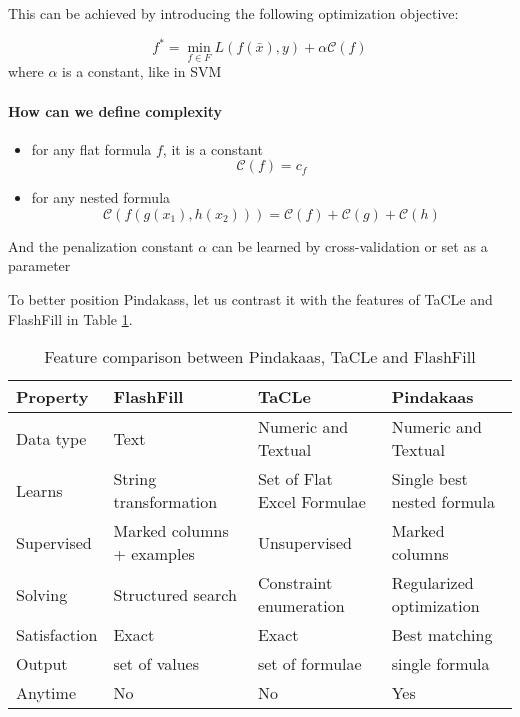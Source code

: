 This can be achieved by introducing the following optimization
objective:

  \begin{equation*}
    f^* = \min_{f \in F}{L(f(\bar x),y) + \alpha \mathcal{C}(f)}
  \end{equation*}
  where $\alpha$ is a constant, like in SVM

\paragraph{How can we define complexity}
  \begin{itemize}
     \item for any flat formula $f$, it is a constant
       \begin{equation*}
         \mathcal{C}(f) = c_f 
       \end{equation*}
     \item for any nested formula 
       \begin{equation*}
       \mathcal{C}(f(g(x_1),h(x_2))) = \mathcal{C}(f) + \mathcal{C}(g) + \mathcal{C}(h)
       \end{equation*}
  \end{itemize}
  And the penalization constant $\alpha$ can be learned by cross-validation or set as a parameter

To better position Pindakass, let us contrast it with the features of
TaCLe and FlashFill in Table \ref{tab:pindakaas_features}.
\begin{table}
  \begin{tabularx}{\textwidth}{l | X | X | X }
    \textbf{Property} & \textbf{FlashFill} & \textbf{TaCLe} &
    \textbf{Pindakaas} \\ \hline
    Data type & Text & Numeric and Textual &  Numeric and
    Textual\\\hline
    Learns & String transformation & Set of Flat Excel Formulae
    & Single best nested formula\\\hline
    Supervised & Marked columns + examples & Unsupervised &
    Marked columns \\\hline
    Solving & Structured search & Constraint enumeration &
    Regularized optimization \\\hline
    Satisfaction & Exact & Exact &  Best
    matching\\\hline
    Output & set of values & set of formulae & single
    formula\\ \hline
    Anytime & No & No & Yes
  \end{tabularx}
  \caption{Feature comparison between Pindakaas, TaCLe and FlashFill}
  \label{tab:pindakaas_features}
\end{table}



